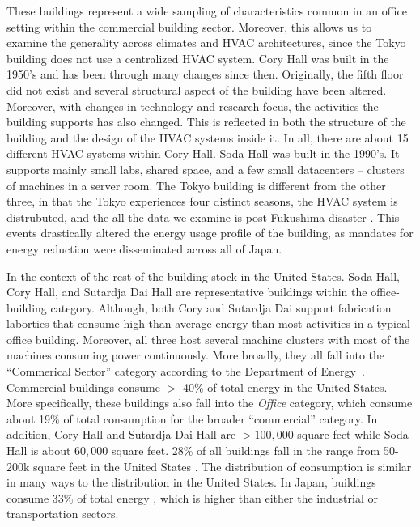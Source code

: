 These buildings represent a wide sampling of characteristics common in an office setting within the commercial building sector.  Moreover,
this allows us to examine the generality across climates and HVAC architectures, since the Tokyo building does not use a centralized
HVAC system.  Cory Hall was built in the 1950's and has been through many changes since then.  Originally, the fifth floor did not exist
and several structural aspect of the building have been altered.  Moreover, with changes in technology and research focus, the activities
the building supports has also changed.  This is reflected in both the structure of the building and the design of the HVAC systems inside it.
In all, there are about 15 different HVAC systems within Cory Hall.  Soda Hall was built in the 1990's.  It supports mainly
small labs, shared space, and a few small datacenters -- clusters of machines in a server room.
The Tokyo building is different from the other three, in that the Tokyo experiences four distinct seasons, the HVAC system is distrubuted,
and the all the data we examine is post-Fukushima disaster \cite{fukushima}.  This events drastically altered the energy usage profile
of the building, as mandates for energy reduction were disseminated across all of Japan.

In the context of the rest of the building stock in the United States.  Soda Hall, Cory Hall, and Sutardja Dai Hall are representative
buildings within the office-building category.  Although, both Cory and Sutardja Dai support fabrication laborties that consume high-than-average
energy than most activities in a typical office building.  Moreover, all three host several machine clusters with most of the machines consuming
power continuously.  More broadly, they all fall into the ``Commerical Sector'' category according to the Department of Energy~\cite{epabuildings}.
Commercial buildings consume $>$ 40\% of total energy in the United States.  More specifically, these buildings also fall into the \emph{Office} category,
which consume about 19\% of total consumption for the broader ``commercial'' category.  In addition, Cory Hall and Sutardja Dai Hall are $>100,000$
square feet while Soda Hall is about $60,000$ square feet.  28\% of all buildings fall in the range from 50-200k square feet in the 
United States \cite{epabuildings}.
The distribution of consumption is similar in many ways to the distribution in the United States.  In Japan, buildings consume 33\% of 
total energy \cite{Japan_buildings}, which is higher than either the industrial or transportation sectors.

